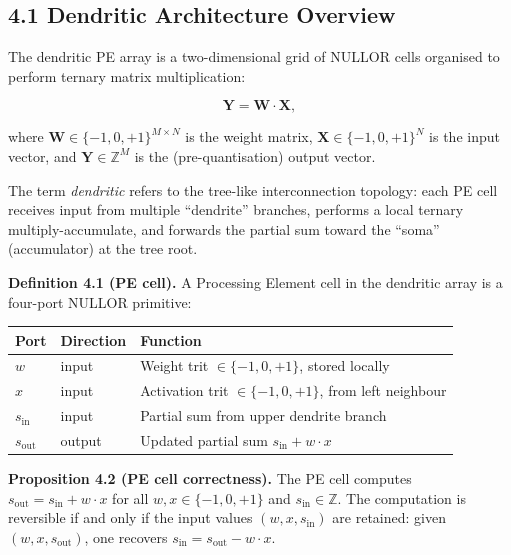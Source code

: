 \subsection{4.1 Dendritic Architecture Overview}

The dendritic PE array is a two-dimensional grid of NULLOR cells
organised to perform ternary matrix multiplication:

\[
\mathbf{Y} = \mathbf{W} \cdot \mathbf{X},
\]

where \(\mathbf{W} \in \{-1, 0, +1\}^{M \times N}\) is the weight
matrix, \(\mathbf{X} \in \{-1, 0, +1\}^{N}\) is the input vector,
and \(\mathbf{Y} \in \mathbb{Z}^{M}\) is the (pre-quantisation)
output vector.

The term \emph{dendritic} refers to the tree-like interconnection
topology: each PE cell receives input from multiple ``dendrite''
branches, performs a local ternary multiply-accumulate, and forwards
the partial sum toward the ``soma'' (accumulator) at the tree root.

\textbf{Definition 4.1 (PE cell).} A Processing Element cell in the
dendritic array is a four-port NULLOR primitive:

\begin{longtable}[]{@{}
  >{\raggedright\arraybackslash}p{}
  >{\raggedright\arraybackslash}p{}
  >{\raggedright\arraybackslash}p{}@{}}
\toprule\noalign{}
Port & Direction & Function \\
\midrule\noalign{}
\endhead
\bottomrule\noalign{}
\endlastfoot
\(w\) & input & Weight trit \(\in \{-1, 0, +1\}\), stored locally \\
\(x\) & input & Activation trit \(\in \{-1, 0, +1\}\), from left neighbour \\
\(s_{\text{in}}\) & input & Partial sum from upper dendrite branch \\
\(s_{\text{out}}\) & output & Updated partial sum \(s_{\text{in}} + w \cdot x\) \\
\end{longtable}

\textbf{Proposition 4.2 (PE cell correctness).} The PE cell computes
\(s_{\text{out}} = s_{\text{in}} + w \cdot x\) for all
\(w, x \in \{-1, 0, +1\}\) and \(s_{\text{in}} \in \mathbb{Z}\).
The computation is reversible if and only if the input values
\((w, x, s_{\text{in}})\) are retained: given \((w, x, s_{\text{out}})\),
one recovers \(s_{\text{in}} = s_{\text{out}} - w \cdot x\).

